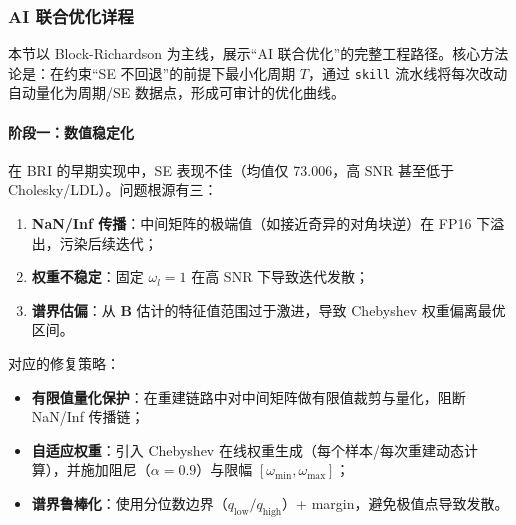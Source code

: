     \subsubsection{AI 联合优化详程}
    \label{sec:ai-opt}

    本节以 Block-Richardson 为主线，展示“AI 联合优化”的完整工程路径。核心方法论是：在约束“SE
    不回退”的前提下最小化周期 $T$，通过 \texttt{skill} 流水线将每次改动自动量化为周期/SE
    数据点，形成可审计的优化曲线。

    \paragraph{阶段一：数值稳定化}

    在 BRI 的早期实现中，SE 表现不佳（均值仅 73.006，高 SNR 甚至低于 Cholesky/LDL）。问题根源有三：
    \begin{enumerate}
        \item \textbf{NaN/Inf 传播}：中间矩阵的极端值（如接近奇异的对角块逆）在 FP16
            下溢出，污染后续迭代；

        \item \textbf{权重不稳定}：固定 $\omega_{l}=1$ 在高 SNR 下导致迭代发散；

        \item \textbf{谱界估偏}：从 $\bm{B}$ 估计的特征值范围过于激进，导致 Chebyshev
            权重偏离最优区间。
    \end{enumerate}

    对应的修复策略：
    \begin{itemize}
        \item \textbf{有限值量化保护}：在重建链路中对中间矩阵做有限值裁剪与量化，阻断
            NaN/Inf 传播链；

        \item \textbf{自适应权重}：引入 Chebyshev 在线权重生成（每个样本/每次重建动态计算），并施加阻尼（$\alpha
            =0.9$）与限幅 $[\omega_{\min},\omega_{\max}]$；

        \item \textbf{谱界鲁棒化}：使用分位数边界（$q_{\text{low}}/q_{\text{high}}$）+
            margin，避免极值点导致发散。
    \end{itemize}

